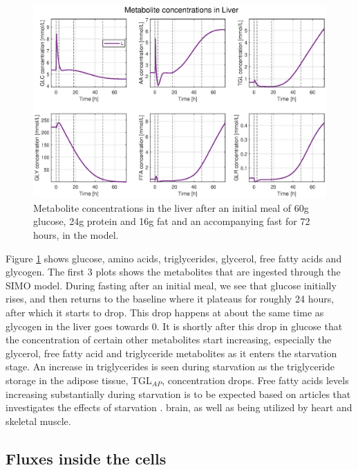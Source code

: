 \documentclass{IEEEtran}
\begin{document}
\begin{figure}[H]
    \centering
    \includegraphics[trim=35 10 35 0, width=\columnwidth]{Diagrams/Fasting/liver_metabolites.eps}
    \caption{Metabolite concentrations in the liver after an initial meal of 60g glucose, 24g protein and 16g fat and an accompanying fast for 72 hours, in the model.}
    \label{fig:Liver_metabolites}
\end{figure}

Figure \ref{fig:Liver_metabolites} shows glucose, amino acids, triglycerides, glycerol, free fatty acids and glycogen. The first 3 plots shows the metabolites that are ingested through the SIMO model. During fasting after an initial meal, we see that glucose initially rises, and then returns to the baseline where it plateaus for roughly 24 hours, after which it starts to drop. This drop happens at about the same time as glycogen in the liver goes towards 0. It is shortly after this drop in glucose that the concentration of certain other metabolites start increasing, especially the glycerol, free fatty acid and triglyceride metabolites as it enters the starvation stage. An increase in triglycerides is seen during starvation as the triglyceride storage in the adipose tissue, TGL$_{AP}$, concentration drops. Free fatty acids levels increasing substantially during starvation is to be expected based on articles that investigates the effects of starvation \cite{unger_eisentraut_madison_1963, yaffe_1980A}.
brain, as well as being utilized by heart and skeletal muscle.\\

\subsection{Fluxes inside the cells}
\end{document}
